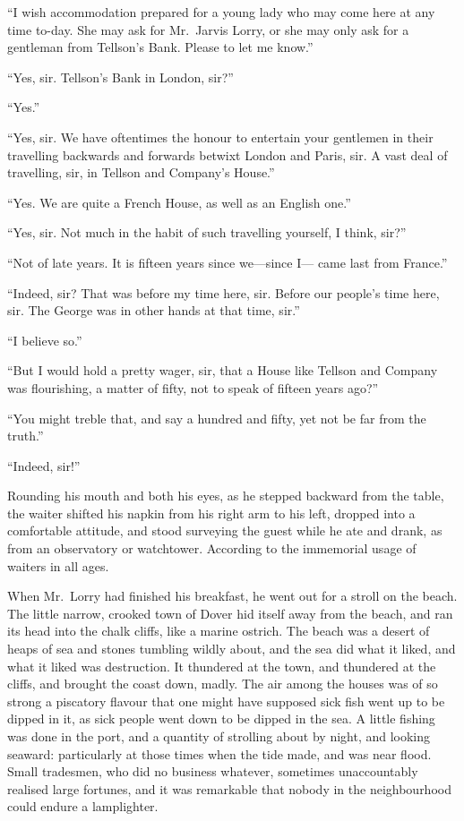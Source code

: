 ``I wish accommodation prepared for a young lady who may come here at
any time to-day.  She may ask for Mr.\ Jarvis Lorry, or she may only
ask for a gentleman from Tellson's Bank.  Please to let me know.''

``Yes, sir.  Tellson's Bank in London, sir?''

``Yes.''

``Yes, sir.  We have oftentimes the honour to entertain your gentlemen
in their travelling backwards and forwards betwixt London and Paris,
sir.  A vast deal of travelling, sir, in Tellson and Company's House.''

``Yes.  We are quite a French House, as well as an English one.''

``Yes, sir.  Not much in the habit of such travelling yourself,
I think, sir?''

``Not of late years.  It is fifteen years since we---since I---%
came last from France.''

``Indeed, sir?  That was before my time here, sir.  Before our people's
time here, sir.  The George was in other hands at that time, sir.''

``I believe so.''

``But I would hold a pretty wager, sir, that a House like Tellson and
Company was flourishing, a matter of fifty, not to speak of fifteen
years ago?''

``You might treble that, and say a hundred and fifty, yet not be far
from the truth.''

``Indeed, sir!''

Rounding his mouth and both his eyes, as he stepped backward from the
table, the waiter shifted his napkin from his right arm to his left,
dropped into a comfortable attitude, and stood surveying the guest
while he ate and drank, as from an observatory or watchtower.
According to the immemorial usage of waiters in all ages.

When Mr.\ Lorry had finished his breakfast, he went out for a stroll
on the beach.  The little narrow, crooked town of Dover hid itself
away from the beach, and ran its head into the chalk cliffs, like a
marine ostrich.  The beach was a desert of heaps of sea and stones
tumbling wildly about, and the sea did what it liked, and what it
liked was destruction.  It thundered at the town, and thundered at
the cliffs, and brought the coast down, madly.  The air among the
houses was of so strong a piscatory flavour that one might have
supposed sick fish went up to be dipped in it, as sick people went
down to be dipped in the sea.  A little fishing was done in the port,
and a quantity of strolling about by night, and looking seaward:
particularly at those times when the tide made, and was near flood.
Small tradesmen, who did no business whatever, sometimes unaccountably
realised large fortunes, and it was remarkable that nobody in the
neighbourhood could endure a lamplighter.

